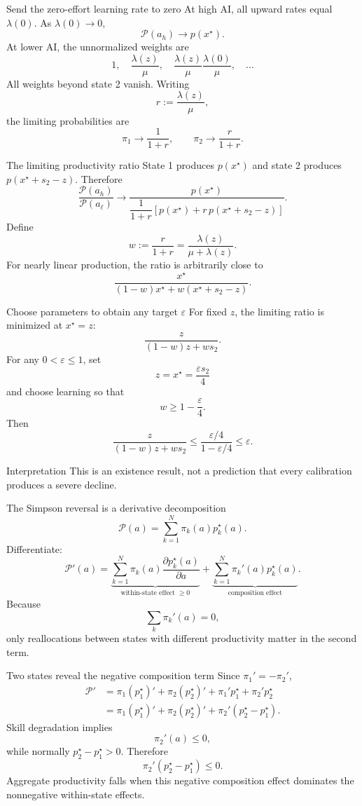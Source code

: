 \documentclass[aspectratio=169,10pt]{beamer}
\newcommand{\calP}{\mathcal{P}}
\begin{document}
\begin{frame}{Send the zero-effort learning rate to zero}
At high AI, all upward rates equal $\lambda(0)$. As $\lambda(0)\to0$,
\[
\calP(a_h)\longrightarrow p(x^\star).
\]
At lower AI, the unnormalized weights are
\[
1,\quad
\frac{\lambda(z)}{\mu},\quad
\frac{\lambda(z)}{\mu}
\frac{\lambda(0)}{\mu},\quad\ldots
\]
All weights beyond state 2 vanish. Writing
\[
r:=\frac{\lambda(z)}{\mu},
\]
the limiting probabilities are
\[
\pi_1\to\frac{1}{1+r},
\qquad
\pi_2\to\frac{r}{1+r}.
\]
\end{frame}

\begin{frame}{The limiting productivity ratio}
State 1 produces $p(x^\star)$ and state 2 produces $p(x^\star+s_2-z)$. Therefore
\[
\frac{\calP(a_h)}{\calP(a_\ell)}
\longrightarrow
\frac{
p(x^\star)}
{
\dfrac{1}{1+r}
\left[
p(x^\star)
+r\,p(x^\star+s_2-z)
\right]
}.
\]
Define
\[
w:=\frac{r}{1+r}
=\frac{\lambda(z)}{\mu+\lambda(z)}.
\]
For nearly linear production, the ratio is arbitrarily close to
\[
\frac{x^\star}
{(1-w)x^\star+w(x^\star+s_2-z)}.
\]
\end{frame}

\begin{frame}{Choose parameters to obtain any target \texorpdfstring{$\varepsilon$}{epsilon}}
For fixed $z$, the limiting ratio is minimized at $x^\star=z$:
\[
\frac{z}{(1-w)z+ws_2}.
\]
For any $0<\varepsilon\le1$, set
\[
z=x^\star=\frac{\varepsilon s_2}{4}
\]
and choose learning so that
\[
w\ge1-\frac{\varepsilon}{4}.
\]
Then
\[
\frac{z}{(1-w)z+ws_2}
\le
\frac{\varepsilon/4}{1-\varepsilon/4}
\le\varepsilon.
\]
\begin{alertblock}{Interpretation}
This is an existence result, not a prediction that every calibration produces a severe decline.
\end{alertblock}
\end{frame}

\begin{frame}{The Simpson reversal is a derivative decomposition}
\[
\calP(a)=
\sum_{k=1}^N
\pi_k(a)p_k^\star(a).
\]
Differentiate:
\[
\boxed{
\calP'(a)=
\underbrace{
\sum_{k=1}^N
\pi_k(a)
\frac{\partial p_k^\star(a)}{\partial a}
}_{\text{within-state effect }\ge0}
+
\underbrace{
\sum_{k=1}^N
\pi_k'(a)p_k^\star(a)
}_{\text{composition effect}}.}
\]
Because
\[
\sum_k\pi_k'(a)=0,
\]
only reallocations between states with different productivity matter in the second term.
\end{frame}

\begin{frame}{Two states reveal the negative composition term}
Since $\pi_1'=-\pi_2'$,
\begin{align*}
\calP'
&=
\pi_1(p_1^\star)'
+\pi_2(p_2^\star)'
+\pi_1'p_1^\star
+\pi_2'p_2^\star\\
&=
\pi_1(p_1^\star)'
+\pi_2(p_2^\star)'
+\pi_2'(p_2^\star-p_1^\star).
\end{align*}
Skill degradation implies
\[
\pi_2'(a)\le0,
\]
while normally $p_2^\star-p_1^\star>0$. Therefore
\[
\pi_2'(p_2^\star-p_1^\star)\le0.
\]
Aggregate productivity falls when this negative composition effect dominates the nonnegative within-state effects.
\end{frame}
\end{document}
